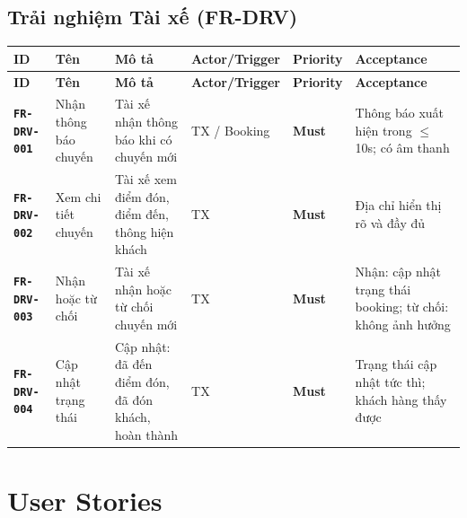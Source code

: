 \documentclass[12pt,a4paper]{article}
\newcommand{\reqid}[1]{\texttt{\textbf{\color{AloBlue}#1}}}
\newcommand{\musthave}{\colorbox{PrioMust}{\small\textbf{Must}}}
\begin{document}
\subsection{Trải nghiệm Tài xế (FR-DRV)}
\begin{longtable}{L{2.2cm} L{2.2cm} L{3.8cm} L{2.8cm} C{1.5cm} L{3cm}}
  \toprule{}\textbf{ID}&\textbf{Tên}&\textbf{Mô tả}&\textbf{Actor/Trigger}&\textbf{Priority}&\textbf{Acceptance}\\
  \midrule\endfirsthead\toprule{}\textbf{ID}&\textbf{Tên}&\textbf{Mô tả}&\textbf{Actor/Trigger}&\textbf{Priority}&\textbf{Acceptance}\\\midrule\endhead\bottomrule\endlastfoot
  \reqid{FR-DRV-001} & Nhận thông báo chuyến & Tài xế nhận thông báo khi có chuyến mới & TX / Booking & \musthave & Thông báo xuất hiện trong $\leq$10s; có âm thanh \\
  \reqid{FR-DRV-002} & Xem chi tiết chuyến & Tài xế xem điểm đón, điểm đến, thông hiện khách & TX & \musthave & Địa chỉ hiển thị rõ và đầy đủ \\
  \reqid{FR-DRV-003} & Nhận hoặc từ chối & Tài xế nhận hoặc từ chối chuyến mới & TX & \musthave & Nhận: cập nhật trạng thái booking; từ chối: không ảnh hưởng \\
  \reqid{FR-DRV-004} & Cập nhật trạng thái & Cập nhật: đã đến điểm đón, đã đón khách, hoàn thành & TX & \musthave & Trạng thái cập nhật tức thì; khách hàng thấy được \\
\end{longtable}

\normalsize

\section{User Stories}
\end{document}
